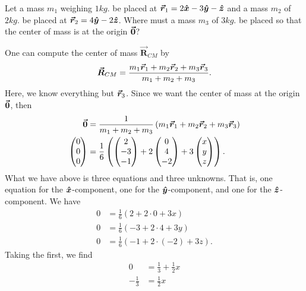 \documentclass[12pt]{article} %
\begin{document}
\newpage
\begin{problem}
Let a mass $m_1$ weighing $1kg.$ be placed at $\boldsymbol{\vec{r}}_1=2\boldsymbol{\hat{x}} -3 \boldsymbol{\hat{y}} -\boldsymbol{\hat{z}}$ and a mass $m_2$ of $2kg.$ be placed at $\boldsymbol{\vec{r}}_2 = 4\boldsymbol{\hat{y}} -2\boldsymbol{\hat{z}}$.  Where must a mass $m_3$ of $3kg.$ be placed so that the center of mass is at the origin $\boldsymbol{\vec{0}}$?
\end{problem}
\begin{solution}
One can compute the center of mass $\boldsymbol{\vec{R}}_{CM}$ by
\[
\boldsymbol{\vec{R}}_{CM} = \frac{m_1\boldsymbol{\vec{r}}_1 + m_2\boldsymbol{\vec{r}}_2 + m_3 \boldsymbol{\vec{r}}_3}{m_1 + m_2 + m_3}.
\]
Here, we know everything but $\boldsymbol{\vec{r}}_3$.  Since we want the center of mass at the origin $\boldsymbol{\vec{0}}$, then
\begin{align*}
\boldsymbol{\vec{0}} &= \frac{1}{m_1+m_2 + m_3} \left( m_1 \boldsymbol{\vec{r}}_1 + m_2 \boldsymbol{\vec{r}}_2 + m_3 \boldsymbol{\vec{r}}_3 \right)\\
\begin{pmatrix} 0 \\ 0 \\ 0\end{pmatrix}&= \frac{1}{6} \left( \begin{pmatrix} 2 \\ -3 \\ -1 \end{pmatrix} + 2 \begin{pmatrix} 0 \\ 4 \\ -2 \end{pmatrix} + 3 \begin{pmatrix} x \\ y \\ z \end{pmatrix}\right).
\end{align*}
What we have above is three equations and three unknowns. That is, one equation for the $\boldsymbol{\hat{x}}$-component, one for the $\boldsymbol{\hat{y}}$-component, and one for the $\boldsymbol{\hat{z}}$-component. We have
\begin{align*}
    0 & = \frac{1}{6} (2 + 2\cdot 0 + 3x)\\
    0 & = \frac{1}{6} (-3 + 2\cdot 4 + 3y)\\
    0 & = \frac{1}{6} (-1 +2\cdot (-2) + 3z).
\end{align*}
Taking the first, we find
\begin{align*}
    0&= \frac{1}{3} +\frac{1}{2}x\\
    -\frac{1}{3}&= \frac{1}{2}x\\

\end{align*}
\end{solution}
\end{document}
